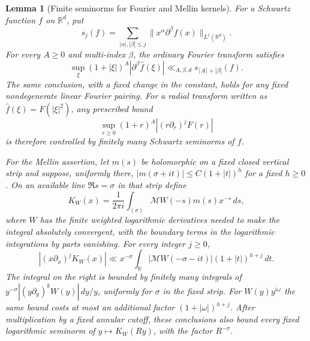 \documentclass[11pt,a4paper]{article}
\numberwithin{equation}{section}
\numberwithin{figure}{section}
\newtheorem{lemma}[theorem]{Lemma}
\theoremstyle{definition}
\theoremstyle{remark}
\begin{document}
\begin{lemma}[Finite seminorms for Fourier and Mellin kernels]
\label{lem:kernel-seminorms}
For a Schwartz function $f$ on $\mathbb R^d$, put
\[
 s_j(f)=\sum_{|\alpha|,|\beta|\le j}
             \|x^\alpha\partial^\beta f(x)\|_{L^1(\mathbb R^d)}.
\]
For every $A\ge0$ and multi-index $\beta$, the ordinary Fourier transform
satisfies
\[
 \sup_\xi(1+|\xi|)^A|\partial^\beta\widehat f(\xi)|
 \ll_{A,\beta,d}s_{\lceil A\rceil+|\beta|}(f).
\]
The same conclusion, with a fixed change in the constant, holds for any
fixed nondegenerate linear Fourier pairing.  For a radial transform written
as $\widehat f(\xi)=F(|\xi|^2)$, any prescribed bound
\[
 \sup_{r\ge0}(1+r)^A|(r\partial_r)^jF(r)|
\]
is therefore controlled by finitely many Schwartz seminorms of $f$.

For the Mellin assertion, let $m(s)$ be holomorphic on a fixed closed
vertical strip and suppose, uniformly there,
$|m(\sigma+it)|\le C(1+|t|)^h$ for a fixed $h\ge0$.  On an available line
$\Re s=\sigma$ in that strip define
\[
 K_W(x)=\frac1{2\pi i}\int_{(\sigma)}\mathcal MW(-s)m(s)x^{-s}\,ds,
\]
where $W$ has the finite weighted logarithmic derivatives needed to make the
integral absolutely convergent, with the boundary terms in the logarithmic
integrations by parts vanishing.  For every integer $j\ge0$,
\[
 |(x\partial_x)^jK_W(x)|
 \ll x^{-\sigma}\int_{\mathbb R}
       |\mathcal MW(-\sigma-it)|(1+|t|)^{h+j}\,dt.
\]
The integral on the right is bounded by finitely many integrals of
$y^{-\sigma}|(y\partial_y)^kW(y)|\,dy/y$, uniformly for $\sigma$ in the
fixed strip.  For $W(y)y^{i\omega}$ the same bound costs at most an additional
factor $(1+|\omega|)^{h+j}$.  After multiplication by a fixed annular cutoff,
these conclusions also bound every fixed logarithmic seminorm of
$y\mapsto K_W(Ry)$, with the factor $R^{-\sigma}$.
\end{lemma}
\end{document}
